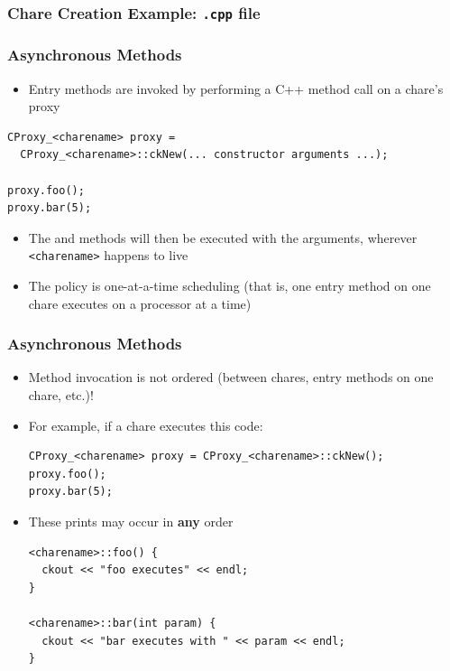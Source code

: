 \begin{frame}[fragile]
  \frametitle{Chare Creation Example: \texttt{.cpp} file}
  
\end{frame}

\begin{frame}[fragile]
  \frametitle{Asynchronous Methods}
  \begin{itemize}
  \item Entry methods are invoked by performing a C++ method call on a chare's
    proxy
  \end{itemize}
  \begin{lstlisting}
CProxy_<charename> proxy =
  CProxy_<charename>::ckNew(... constructor arguments ...);

proxy.foo();
proxy.bar(5);
\end{lstlisting}
\begin{itemize}
\item The  and  methods will then be executed with the
  arguments, wherever \texttt{<charename>} happens to live
\item The policy is one-at-a-time scheduling (that is, one entry method on one
  chare executes on a processor at a time)
\end{itemize}
\end{frame}

\begin{frame}[fragile]
  \frametitle{Asynchronous Methods}
  \begin{itemize}
  \item Method invocation is not ordered (between chares, entry methods on one
    chare, etc.)!
  \item For example, if a chare executes this code:
  \begin{lstlisting}
CProxy_<charename> proxy = CProxy_<charename>::ckNew();
proxy.foo();
proxy.bar(5);
  \end{lstlisting}
  \item These prints may occur in \textbf{any} order
  \begin{lstlisting}
<charename>::foo() {
  ckout << "foo executes" << endl;
}

<charename>::bar(int param) {
  ckout << "bar executes with " << param << endl;
}
\end{lstlisting}
  \end{itemize}
\end{frame}


